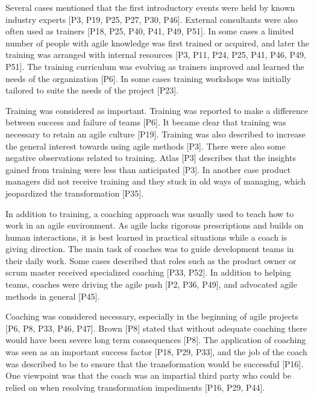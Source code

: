 Several cases mentioned that the first introductory events were held by known
industry experts [P3, P19, P25, P27, P30, P46]. External consultants were also
often used as trainers [P18, P25, P40, P41, P49, P51]. In some cases a limited
number of people with agile knowledge was first trained or acquired, and later
the training was arranged with internal resources [P3, P11, P24, P25, P41, P46,
P49, P51].
The training curriculum was evolving as trainers improved and learned the needs
of the organization [P6]. In some cases training workshops was initially
tailored to suite the needs of the project [P23].

Training was considered as important. Training was reported to make a difference
between success and failure of teams [P6].
It became clear that training was necessary to retain an agile culture [P19].
Training was also described to increase the general interest towards using agile
methods [P3].
There were also some negative observations related to training. Atlas [P3]
describes that the insights gained from training were less than anticipated
[P3]. In another case product managers did not receive training and they stuck
in old ways of managing, which jeopardized the transformation [P35].



In addition to training, a coaching approach was usually used to teach how to
work in an agile environment. As agile lacks rigorous prescriptions and builds
on human interactions, it is best learned in practical situations while a coach
is giving direction.
The main task of coaches was to guide development teams in their daily work.
Some cases described that roles such as the product owner or scrum master
received specialized coaching [P33, P52].
In addition to helping teams, coaches were driving the agile push [P2, P36,
P49], and advocated agile methods in general [P45].

Coaching was considered necessary, especially in the beginning of agile projects
[P6, P8, P33, P46, P47]. Brown [P8] stated that without adequate coaching there
would have been severe long term consequences [P8]. The application of coaching
was seen as an important success factor [P18, P29, P33], and the job of the
coach was described to be to ensure that the transformation would be successful
[P16]. One viewpoint was that the coach was an impartial third party who could
be relied on when resolving transformation impediments [P16, P29, P44].

